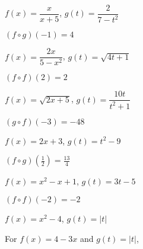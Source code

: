 \documentclass{ximera}
\begin{document}
\begin{question}
$f(x) = \dfrac{x}{x+5}$, $g(t) = \dfrac{2}{7-t^2}$


\begin{solution}
$(f\circ g)(-1) = 4$
\end{solution}

\end{question}

\begin{question}
$f(x) = \dfrac{2x}{5-x^2}$, $g(t) = \sqrt{4t+1}$
\begin{solution}
$(f \circ f)(2) = 2$








\end{solution}

\end{question}

\begin{question}
$f(x) =\sqrt{2x+5}$, $g(t) = \dfrac{10t}{t^2+1}$ 

\begin{solution}
$(g\circ f)(-3) = -48$
\end{solution}

\end{question}

\begin{question}
$f(x) = 2x+3$, $g(t) = t^2-9$
\begin{solution}
$(f\circ g)\left(\frac{1}{2}\right) = \frac{13}{4}$
\end{solution}

\end{question}

\begin{question}
$f(x) = x^2 -x+1$, $g(t) = 3t-5$ 

\begin{solution}
$(f \circ f)(-2) = -2$


\end{solution}

\end{question}

\begin{question}
$f(x) = x^2-4$, $g(t) = |t|$
\begin{solution}
For   $f(x) = 4-3x$ and  $g(t) = |t|$,



\end{solution}

\end{question}
\end{document}
